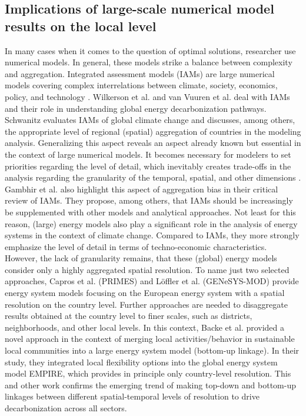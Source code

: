 \subsection{Implications of large-scale numerical model results on the local level}
In many cases when it comes to the question of optimal solutions, researcher use numerical models. In general, these models strike a balance between complexity and aggregation. Integrated assessment models (IAMs) are large numerical models covering complex interrelations between climate, society, economics, policy, and technology \cite{dowlatabadi1995integrated}. Wilkerson et al. \cite{wilkerson2015comparison} and van Vuuren et al. \cite{van2016carbon} deal with IAMs and their role in understanding global energy decarbonization pathways. Schwanitz \cite{schwanitz2013evaluating} evaluates IAMs of global climate change and discusses, among others, the appropriate level of regional (spatial) aggregation of countries in the modeling analysis. Generalizing this aspect reveals an aspect already known but essential in the context of large numerical models. It becomes necessary for modelers to set priorities regarding the level of detail, which inevitably creates trade-offs in the analysis regarding the granularity of the temporal, spatial, and other dimensions \cite{gargiulo2013long}. Gambhir et al. \cite{gambhir2019review} also highlight this aspect of aggregation bias in their critical review of IAMs. They propose, among others, that IAMs should be increasingly be supplemented with other models and analytical approaches. Not least for this reason, (large) energy models also play a significant role in the analysis of energy systems in the context of climate change. Compared to IAMs, they more strongly emphasize the level of detail in terms of techno-economic characteristics. However, the lack of granularity remains, that these (global) energy models consider only a highly aggregated spatial resolution. To name just two selected approaches, Capros et al. \cite{capros2012model} (PRIMES) and Löffler et al. \cite{loffler2017designing} (GENeSYS-MOD) provide energy system models focusing on the European energy system with a spatial resolution on the country level. Further approaches are needed to disaggregate results obtained at the country level to finer scales, such as districts, neighborhoods, and other local levels. In this context, Backe et al. \cite{backe2021heat} provided a novel approach in the context of merging local activities/behavior in sustainable local communities into a large energy system model (bottom-up linkage). In their study, they integrated local flexibility options into the global energy system model EMPIRE, which provides in principle only country-level resolution. This and other work confirms the emerging trend of making top-down and bottom-up linkages between different spatial-temporal levels of resolution to drive decarbonization across all sectors.\vspace{0.3cm}

